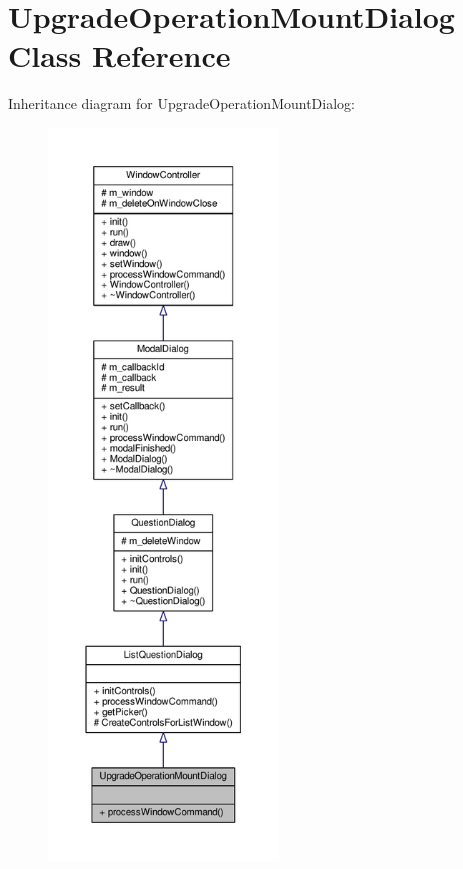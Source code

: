 \hypertarget{classUpgradeOperationMountDialog}{}\section{Upgrade\+Operation\+Mount\+Dialog Class Reference}
\label{classUpgradeOperationMountDialog}


Inheritance diagram for Upgrade\+Operation\+Mount\+Dialog\+:
\nopagebreak
\begin{figure}[H]
\begin{center}
\leavevmode
\includegraphics[height=550pt]{d9/dda/classUpgradeOperationMountDialog__inherit__graph}
\end{center}
\end{figure}


